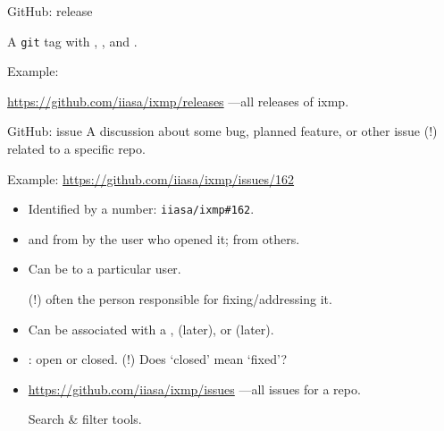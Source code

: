\documentclass[12pt,aspectratio=169]{beamer}
\begin{document}
\begin{frame}{GitHub: release}

{ \Large
A \texttt{git} tag with , , and .}

\bigskip
Example:

\url{https://github.com/iiasa/ixmp/releases} —all releases of ixmp.

\end{frame}

\begin{frame}{GitHub: issue}
A discussion about some bug, planned feature, or other issue \alert{(!)} related to a specific repo.

\bigskip
Example: \url{https://github.com/iiasa/ixmp/issues/162}

\bigskip
\begin{itemize}
  \item Identified by a number: \texttt{iiasa/ixmp\#162}.
  \item {} and  from by the user who opened it;  from others.
  \item Can be  to a particular user.

    \alert{(!)} often the person responsible for fixing/addressing it.
  \item Can be associated with a ,  (later), or  (later).
  \item {}: open or closed.
    \alert{(!)} Does ‘closed’ mean ‘fixed’?
  \item \url{https://github.com/iiasa/ixmp/issues} —all issues for a repo.

    \hspace{2em} Search \& filter tools.
\end{itemize}

\end{frame}
\end{document}

